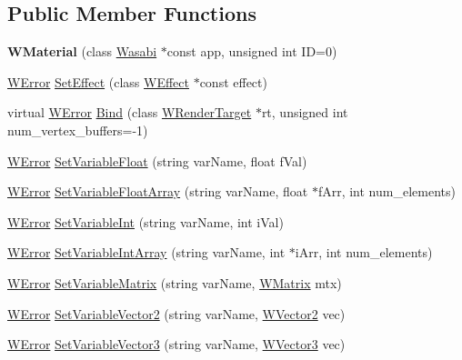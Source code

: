 \subsection*{Public Member Functions}
\begin{DoxyCompactItemize}
\item 
{\bfseries W\+Material} (class \hyperlink{class_wasabi}{Wasabi} $\ast$const app, unsigned int ID=0)\hypertarget{class_w_material_a5bfc9ab92d0ed404bd31e7e85a3a3306}{}\label{class_w_material_a5bfc9ab92d0ed404bd31e7e85a3a3306}

\item 
\hyperlink{class_w_error}{W\+Error} \hyperlink{class_w_material_ae48bfe0ea4d05867d077b8b48989c584}{Set\+Effect} (class \hyperlink{class_w_effect}{W\+Effect} $\ast$const effect)
\item 
virtual \hyperlink{class_w_error}{W\+Error} \hyperlink{class_w_material_a420e012110ddabf5410bab0805fac025}{Bind} (class \hyperlink{class_w_render_target}{W\+Render\+Target} $\ast$rt, unsigned int num\+\_\+vertex\+\_\+buffers=-\/1)
\item 
\hyperlink{class_w_error}{W\+Error} \hyperlink{class_w_material_ae2ec704f31b54ea0a1f8c9d30ea327d7}{Set\+Variable\+Float} (string var\+Name, float f\+Val)
\item 
\hyperlink{class_w_error}{W\+Error} \hyperlink{class_w_material_a28b095dc5ac19dc38dc8022bce985f91}{Set\+Variable\+Float\+Array} (string var\+Name, float $\ast$f\+Arr, int num\+\_\+elements)
\item 
\hyperlink{class_w_error}{W\+Error} \hyperlink{class_w_material_ac1fb138e3ef4b40fec3334e0ad569068}{Set\+Variable\+Int} (string var\+Name, int i\+Val)
\item 
\hyperlink{class_w_error}{W\+Error} \hyperlink{class_w_material_a1b0c5a02616ab0b8722c2c68e7e25c79}{Set\+Variable\+Int\+Array} (string var\+Name, int $\ast$i\+Arr, int num\+\_\+elements)
\item 
\hyperlink{class_w_error}{W\+Error} \hyperlink{class_w_material_aa791d00b4497df9ce81bab36df3fd369}{Set\+Variable\+Matrix} (string var\+Name, \hyperlink{class_w_matrix}{W\+Matrix} mtx)
\item 
\hyperlink{class_w_error}{W\+Error} \hyperlink{class_w_material_a4de2149658e89f97d79ced3e7ec18bcd}{Set\+Variable\+Vector2} (string var\+Name, \hyperlink{class_w_vector2}{W\+Vector2} vec)
\item 
\hyperlink{class_w_error}{W\+Error} \hyperlink{class_w_material_a09edc2496ed59ab067e3c8a412856d74}{Set\+Variable\+Vector3} (string var\+Name, \hyperlink{class_w_vector3}{W\+Vector3} vec)

\end{DoxyCompactItemize}
